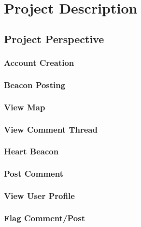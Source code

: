 \section{Project Description}

    \subsection{Project Perspective}
        \subsubsection{Account Creation}
        \subsubsection{Beacon Posting}
        \subsubsection{View Map}
        \subsubsection{View Comment Thread}
        \subsubsection{Heart Beacon}
        \subsubsection{Post Comment}
        \subsubsection{View User Profile}
        \subsubsection{Flag Comment/Post}

